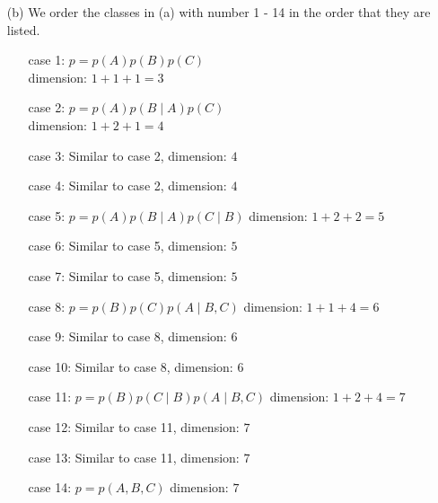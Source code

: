 \documentclass[11pt]{article}
\begin{document}
\begin{answertext}{22cm}{}
\begin{enumerate}
\item[(b)]
We order the classes in (a) with number 1 - 14 in the order that they are listed. \\
\begin{enumerate}
\item[case 1:]
$p = p(A)p(B)p(C)$ \\
dimension: $1 + 1 + 1 = 3$
\item[case 2:]
$p = p(A)p(B \mid A)p(C)$ \\
dimension: $1 + 2 + 1 = 4$
\item[case 3:]
Similar to case 2, dimension: $4$
\item[case 4:]
Similar to case 2, dimension: $4$
\item[case 5:]
$p = p(A)p(B \mid A)p(C \mid B)$
dimension: $1 + 2 + 2 = 5$
\item[case 6:]
Similar to case 5, dimension: $5$
\item[case 7:]
Similar to case 5, dimension: $5$
\item[case 8:]
$p = p(B)p(C)p(A \mid B,C)$
dimension: $1 + 1 + 4 = 6$
\item[case 9:]
Similar to case 8, dimension: $6$
\item[case 10:]
Similar to case 8, dimension: $6$
\item[case 11:]
$p = p(B)p(C \mid B)p(A \mid B,C)$
dimension: $1 + 2 + 4 = 7$
\item[case 12:]
Similar to case 11, dimension: $7$
\item[case 13:]
Similar to case 11, dimension: $7$
\item[case 14:]
$p = p(A,B,C)$
dimension: $7$
\end{enumerate}
\end{enumerate}
\end{answertext}
\end{document}
